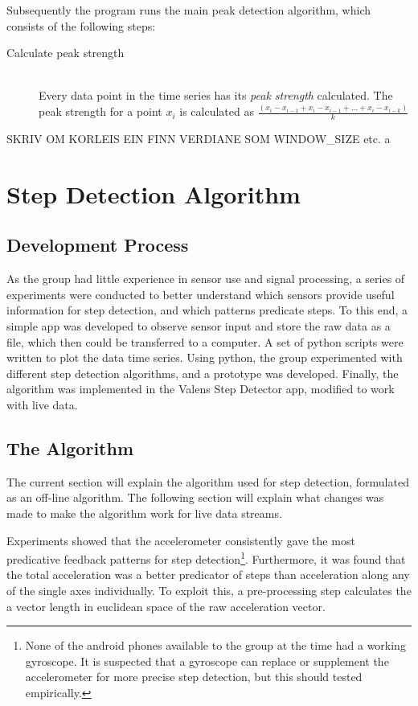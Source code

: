 Subsequently the program runs the main peak detection algorithm, which consists of the following steps:
\begin{description}
\item[Calculate peak strength] \hfill \\
Every data point in the time series has its \emph{peak strength} calculated. The peak strength for a point $x_{i}$ is calculated as $\frac{(x_{i} - x_{i-1} + x_{i} - x_{i-1} + \ldots + x_{i} - x_{i-k})}{k}$
\end{description}

SKRIV OM KORLEIS EIN FINN VERDIANE SOM WINDOW\_SIZE etc. 
a\chapter{Step Detection Algorithm}

\section{Development Process}
As the group had little experience in sensor use and signal processing, a series of experiments were conducted to better understand which sensors provide useful information for step detection, and which patterns predicate steps. To this end, a simple app was developed to observe sensor input and store the raw data as a file, which then could be transferred to a computer. A set of python scripts were written to plot  the data time series. Using python, the group experimented with different step detection algorithms, and a prototype was developed. Finally, the algorithm was implemented in the Valens Step Detector app, modified to work with live data.

\section{The Algorithm}
The current section will explain the algorithm used for step detection, formulated as an off-line algorithm. The following section will explain what changes was made to make the algorithm work for live data streams.

Experiments showed that the accelerometer consistently gave the most predicative feedback patterns for step detection\footnote{None of the android phones available to the group at the time had a working gyroscope. It is suspected that a gyroscope can replace or supplement the accelerometer for more precise step detection, but this should tested empirically.}. Furthermore, it was found that the total acceleration was a better predicator of steps than acceleration along any of the single axes individually. To exploit this, a pre-processing step calculates the a vector length in euclidean space of the raw acceleration vector.

